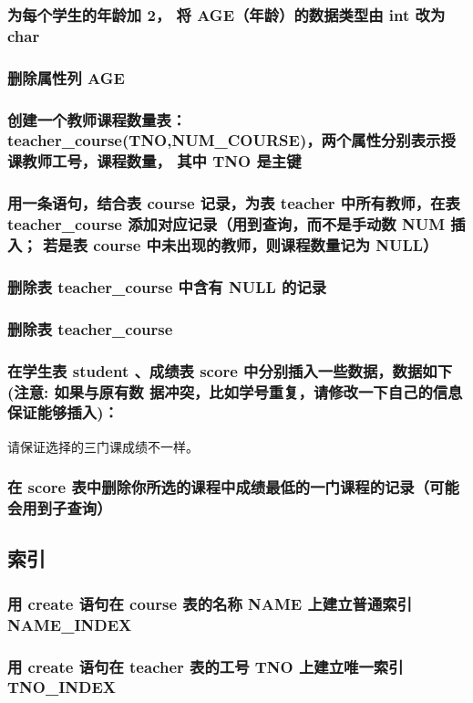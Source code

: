 \documentclass{ctexart}
\begin{document}
\subsubsection{为每个学生的年龄加 2， 将 AGE（年龄）的数据类型由 int 改为 char}
\subsubsection{删除属性列 AGE}
\subsubsection{创建一个教师课程数量表： teacher\_course(TNO,NUM\_COURSE)，两个属性分别表示授课教师工号，课程数量， 其中 TNO 是主键}
\subsubsection{用一条语句，结合表 course 记录，为表 teacher 中所有教师，在表 teacher\_course 添加对应记录（用到查询，而不是手动数 NUM 插入； 若是表 course 中未出现的教师，则课程数量记为 NULL）}
\subsubsection{删除表 teacher\_course 中含有 NULL 的记录}
\subsubsection{删除表 teacher\_course}
\subsubsection{在学生表 student 、成绩表 score 中分别插入一些数据，数据如下(注意: 如果与原有数
据冲突，比如学号重复，请修改一下自己的信息保证能够插入)：}
请保证选择的三门课成绩不一样。
\subsubsection{在 score 表中删除你所选的课程中成绩最低的一门课程的记录（可能会用到子查询）}
\subsection{索引}
\subsubsection{用 create 语句在 course 表的名称 NAME 上建立普通索引 NAME\_INDEX}
\subsubsection{用 create 语句在 teacher 表的工号 TNO 上建立唯一索引 TNO\_INDEX}
\end{document}
